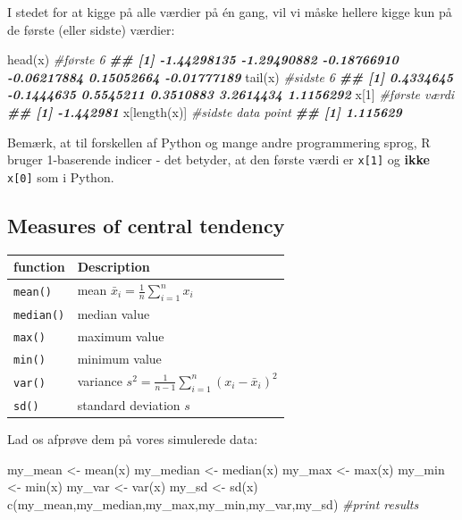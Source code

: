 \documentclass[
]{book}
\newenvironment{Shaded}{\begin{snugshade}}{\end{snugshade}}
\newcommand{\CommentTok}[1]{\textcolor[rgb]{0.56,0.35,0.01}{\textit{#1}}}
\newcommand{\DecValTok}[1]{\textcolor[rgb]{0.00,0.00,0.81}{#1}}
\newcommand{\DocumentationTok}[1]{\textcolor[rgb]{0.56,0.35,0.01}{\textbf{\textit{#1}}}}
\newcommand{\FunctionTok}[1]{\textcolor[rgb]{0.00,0.00,0.00}{#1}}
\newcommand{\NormalTok}[1]{#1}
\newcommand{\OtherTok}[1]{\textcolor[rgb]{0.56,0.35,0.01}{#1}}
\begin{document}
I stedet for at kigge på alle værdier på én gang, vil vi måske hellere kigge kun på de første (eller sidste) værdier:

\begin{Shaded}
\begin{Highlighting}[]
\FunctionTok{head}\NormalTok{(x) }\CommentTok{\#første 6}
\DocumentationTok{\#\# [1] {-}1.44298135 {-}1.29490882 {-}0.18766910 {-}0.06217884  0.15052664 {-}0.01777189}
\FunctionTok{tail}\NormalTok{(x) }\CommentTok{\#sidste 6}
\DocumentationTok{\#\# [1]  0.4334645 {-}0.1444635  0.5545211  0.3510883  3.2614434  1.1156292}
\NormalTok{x[}\DecValTok{1}\NormalTok{] }\CommentTok{\#første værdi}
\DocumentationTok{\#\# [1] {-}1.442981}
\NormalTok{x[}\FunctionTok{length}\NormalTok{(x)] }\CommentTok{\#sidste data point}
\DocumentationTok{\#\# [1] 1.115629}
\end{Highlighting}
\end{Shaded}

Bemærk, at til forskellen af Python og mange andre programmering sprog, R bruger 1-baserende indicer - det betyder, at den første værdi er \texttt{x{[}1{]}} og \textbf{ikke} \texttt{x{[}0{]}} som i Python.

\hypertarget{measures-of-central-tendency}{%
\subsection{Measures of central tendency}\label{measures-of-central-tendency}}

\begin{longtable}[]{@{}ll@{}}
\toprule
function & Description \\
\midrule
\endhead
\texttt{mean()} & mean \(\bar{x}_{i} = \frac{1}{n}\sum_{i=1}^{n} x_{i}\) \\
\texttt{median()} & median value \\
\texttt{max()} & maximum value \\
\texttt{min()} & minimum value \\
\texttt{var()} & variance \(s^2 = \frac{1}{n-1}\sum_{i=1}^{n} (x_{i} - \bar{x}_{i})^2\) \\
\texttt{sd()} & standard deviation \(s\) \\
\bottomrule
\end{longtable}

Lad os afprøve dem på vores simulerede data:

\begin{Shaded}
\begin{Highlighting}[]
\NormalTok{my\_mean }\OtherTok{\textless{}{-}} \FunctionTok{mean}\NormalTok{(x)}
\NormalTok{my\_median }\OtherTok{\textless{}{-}} \FunctionTok{median}\NormalTok{(x)}
\NormalTok{my\_max }\OtherTok{\textless{}{-}} \FunctionTok{max}\NormalTok{(x)}
\NormalTok{my\_min }\OtherTok{\textless{}{-}} \FunctionTok{min}\NormalTok{(x)}
\NormalTok{my\_var }\OtherTok{\textless{}{-}} \FunctionTok{var}\NormalTok{(x)}
\NormalTok{my\_sd }\OtherTok{\textless{}{-}} \FunctionTok{sd}\NormalTok{(x)}
\FunctionTok{c}\NormalTok{(my\_mean,my\_median,my\_max,my\_min,my\_var,my\_sd) }\CommentTok{\#print results}
\end{Highlighting}
\end{Shaded}
\end{document}
